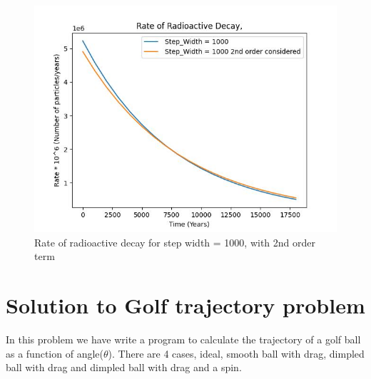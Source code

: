 \documentclass[11pt]{article}
\begin{document}
\begin{figure}[b]
    \centering
    \includegraphics[width=\textwidth, height=\textheight, keepaspectratio]{Carbon_plot_1000_with 2nd order.jpeg}
    \caption{Rate of radioactive decay for step width = 1000, with 2nd order term}
    \label{fig:Rate of radioactive decay for step width = 1000, with 2nd order term}
\end{figure}


\section{Solution to Golf trajectory problem}
In this problem we have write a program to calculate the trajectory of a golf ball as a function of angle($\theta$). There are 4 cases, ideal, smooth ball with drag, dimpled ball with drag and dimpled ball with drag and a spin.
\end{document}
